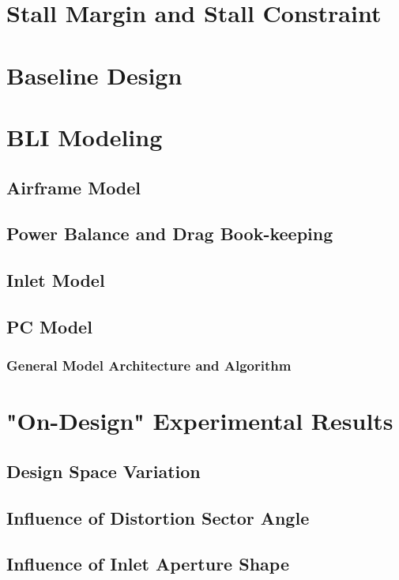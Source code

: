 \documentclass[12pt]{gatech-thesis}
\begin{document}
\section{Stall Margin and Stall Constraint}


\section{Baseline Design}
\section{BLI Modeling}
\subsection{Airframe Model}
\subsection{Power Balance and Drag Book-keeping}
\subsection{Inlet Model}
\subsection{PC Model}
\subsubsection{General Model Architecture and Algorithm}

\section{"On-Design" Experimental Results}

\subsection{Design Space Variation}

\subsection{Influence of Distortion Sector Angle}

\subsection{Influence of Inlet Aperture Shape}
\end{document}
